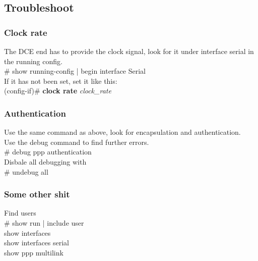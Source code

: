 \subsection{Troubleshoot}
\subsubsection*{Clock rate}
\textrm{The DCE end has to provide the clock signal, look for it under interface serial in the running config.}\\
\# show running-config | begin interface Serial\vspace{11pt}\\
\textrm{If it has not been set, set it like this:}\vspace{1pt}\\
(config-if)\# \textbf{clock rate} \textit{clock\_rate}
\subsubsection*{Authentication}
\textrm{Use the same command as above, look for encapsulation and authentication.\\ Use the debug command to find further errors.}\\
\# debug ppp authentication\vspace{11pt}\\
\textrm{Disbale all debugging with}\\
\# undebug all
\subsubsection*{Some other shit}
\textrm{Find users}\\
\# show run | include user\vspace{11pt}\\
show interfaces\\
show interfaces serial\\
show ppp multilink